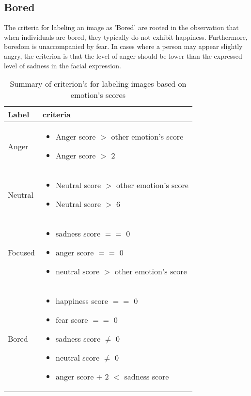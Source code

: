 \subsection{Bored}
The criteria for labeling an image as 'Bored' are rooted in the observation that when individuals are bored, they typically do not exhibit happiness. Furthermore, boredom is unaccompanied by fear. In cases where a person may appear slightly angry, the criterion is that the level of anger should be lower than the expressed level of sadness in the facial expression.


\begin{table}[h]
	\centering
	\caption{Summary of criterion's for labeling images based on emotion's scores}
	\begin{tabular}{|m{2cm}|m{8cm}|}
		\hline
		Label & criteria \\ \hline
		Anger & \begin{itemize}
			\item Anger score $>$ other emotion's score
			\item Anger score $>$ 2
		\end{itemize} \\ \hline
		Neutral & \begin{itemize}
			\item Neutral score $>$ other emotion's score
                \item Neutral score $>$ 6
		\end{itemize} \\ \hline
		Focused & \begin{itemize}
			\item sadness score $==$ 0
                \item anger score $==$ 0
			\item neutral score $>$ other emotion's score
		\end{itemize} \\ \hline
		Bored & \begin{itemize}
			\item happiness score $==$ 0
			\item fear score $==$ 0
                \item sadness score $\neq$ 0
                \item neutral score $\neq$ 0
			\item anger score + 2 $<$ sadness score
		\end{itemize} \\ \hline
	\end{tabular}
\end{table}
